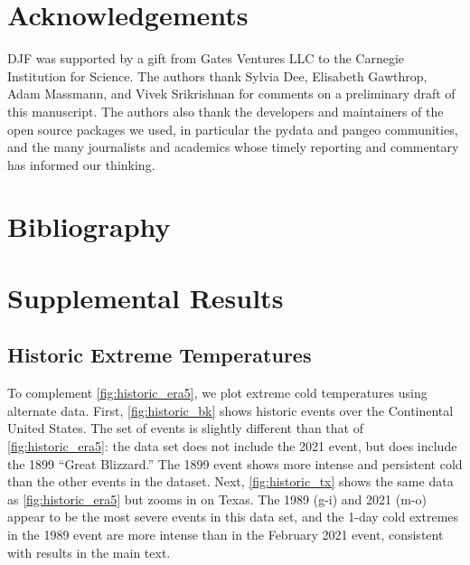 \documentclass[12pt]{iopart}
\begin{document}
\section*{Acknowledgements}

DJF was supported by a gift from Gates Ventures LLC to the Carnegie Institution for Science.
The authors thank
Sylvia Dee,
Elisabeth Gawthrop,
Adam Massmann,
and
Vivek Srikrishnan
for comments on a preliminary draft of this manuscript.
The authors also thank the developers and maintainers of the open source packages we used, in particular the pydata and pangeo communities, and the many journalists and academics whose timely reporting and commentary has informed our thinking.

\section*{Bibliography}



\clearpage
\appendix
\section{Supplemental Results}
\renewcommand{\thefigure}{S\arabic{figure}}
\setcounter{figure}{0}

\subsection{Historic Extreme Temperatures}

To complement \cref{fig:historic_era5}, we plot extreme cold temperatures using alternate data.
First, \cref{fig:historic_bk} shows historic events over the Continental United States.
The set of events is slightly different than that of \cref{fig:historic_era5}: the data set does not include the 2021 event, but does include the 1899 ``Great Blizzard.''
The 1899 event shows more intense and persistent cold than the other events in the dataset.
Next, \cref{fig:historic_tx} shows the same data as \cref{fig:historic_era5} but zooms in on Texas.
The 1989 (g-i) and 2021 (m-o) appear to be the most severe events in this data set, and the 1-day cold extremes in the 1989 event are more intense than in the February 2021 event, consistent with results in the main text.
\end{document}
